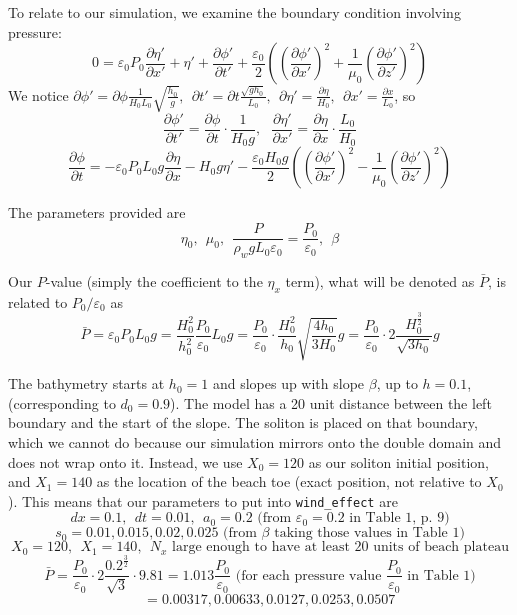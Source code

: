 \documentclass[10pt,a4paper]{article}
\begin{document}
To relate to our simulation, we examine the boundary condition involving pressure:
$$0 = \varepsilon_0P_0 \frac{\partial \eta'}{\partial x'} + \eta' + \frac{\partial\phi'}{\partial t'} + \frac{\varepsilon_0}{2}\left(\left(\frac{\partial \phi'}{\partial x'}\right)^2 + \frac{1}{\mu_0}\left(\frac{\partial \phi'}{\partial z'}\right)^2\right)$$
We notice $\partial\phi' = \partial\phi\frac{1}{H_0L_0}\sqrt{\frac{h_0}{g}},~~\partial t' = \partial t\frac{\sqrt{gh_0}}{L_0},~~\partial \eta' = \frac{\partial\eta}{H_0},~~\partial x' = \frac{\partial x}{L_0}$, so
$$\frac{\partial \phi'}{\partial t'} = \frac{\partial\phi}{\partial t}\cdot \frac{1}{H_0g},~~~\frac{\partial \eta'}{\partial x'} = \frac{\partial \eta}{\partial x} \cdot \frac{L_0}{H_0}$$
$$\frac{\partial \phi}{\partial t} = -\varepsilon_0P_0L_0g \frac{\partial \eta}{\partial x} - H_0g\eta'- \frac{\varepsilon_0H_0g}{2}\left(\left(\frac{\partial \phi'}{\partial x'}\right)^2 - \frac{1}{\mu_0}\left(\frac{\partial \phi'}{\partial z'}\right)^2\right)$$

The parameters provided are
$$\eta_0,~~\mu_0,~~\frac{P}{\rho_w g L_0 \varepsilon_0}=\frac{P_0}{\varepsilon_0},~~\beta$$

Our $P$-value (simply the coefficient to the $\eta_x$ term), what will be denoted as $\bar P$, is related to $P_0/\varepsilon_0$ as
$$\bar P = \varepsilon_0P_0L_0g = \frac{H_0^2}{h_0^2}\frac{P_0}{\varepsilon_0}L_0g= \frac{P_0}{\varepsilon_0}\cdot \frac{H_0^2}{h_0}\sqrt{\frac{4h_0}{3H_0}}g= \frac{P_0}{\varepsilon_0}\cdot 2\frac{H_0^{\frac{3}{2}}}{\sqrt {3h_0}}g$$
\pagebreak

The bathymetry starts at $h_0=1$ and slopes up with slope $\beta$, up to $h = 0.1$, (corresponding to $d_0 = 0.9$). The model has a 20 unit distance between the left boundary and the start of the slope.
The soliton is placed on that boundary, which we cannot do because our simulation mirrors onto the double domain and does not wrap onto it. Instead, we use $X_0 = 120$ as our soliton initial position, and $X_1 = 140$ as the location of the beach toe (exact position, not relative to $X_0$). This means that our parameters to put into \texttt{wind\_effect} are
$$dx = 0.1,~~dt=0.01,~~a_0=0.2 \text{ (from }\varepsilon_0 = 0.2\text{ in Table 1, p. 9)}$$
$$s_0 = 0.01,0.015,0.02,0.025 \text{ (from }\beta \text{ taking those values in Table 1)}$$
$$X_0 = 120,~~X_1=140,~~N_x \text{ large enough to have at least 20 units of beach plateau}$$
$$\bar P = \frac{P_0}{\varepsilon_0}\cdot 2\frac{0.2^{\frac{3}{2}}}{\sqrt {3}}\cdot 9.81 = 1.013\frac{P_0}{\varepsilon_0} \text{ (for each pressure value $\frac{P_0}{\varepsilon_0}$ in Table 1)}$$
$$~~~~~~ = 0.00317, 0.00633, 0.0127, 0.0253, 0.0507$$
\end{document}
